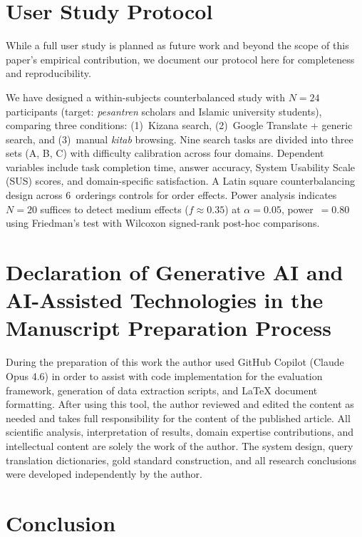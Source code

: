 \documentclass[preprint,12pt,numbers]{elsarticle}
\begin{document}
\section{User Study Protocol}
\label{sec:user-study}

While a full user study is planned as future work and beyond the scope of this paper's empirical contribution, we document our protocol here for completeness and reproducibility.

We have designed a within-subjects counterbalanced study with $N = 24$ participants (target: \textit{pesantren} scholars and Islamic university students), comparing three conditions: (1)~Kizana search, (2)~Google Translate + generic search, and (3)~manual \textit{kitab} browsing. Nine search tasks are divided into three sets (A, B, C) with difficulty calibration across four domains. Dependent variables include task completion time, answer accuracy, System Usability Scale (SUS) scores, and domain-specific satisfaction. A Latin square counterbalancing design across 6~orderings controls for order effects. Power analysis indicates $N = 20$ suffices to detect medium effects ($f \approx 0.35$) at $\alpha = 0.05$, power~$= 0.80$ using Friedman's test with Wilcoxon signed-rank post-hoc comparisons.

\section*{Declaration of Generative AI and AI-Assisted Technologies in the Manuscript Preparation Process}

During the preparation of this work the author used GitHub Copilot (Claude Opus 4.6) in order to assist with code implementation for the evaluation framework, generation of data extraction scripts, and LaTeX document formatting. After using this tool, the author reviewed and edited the content as needed and takes full responsibility for the content of the published article. All scientific analysis, interpretation of results, domain expertise contributions, and intellectual content are solely the work of the author. The system design, query translation dictionaries, gold standard construction, and all research conclusions were developed independently by the author.

\section{Conclusion}
\label{sec:conclusion}
\end{document}
